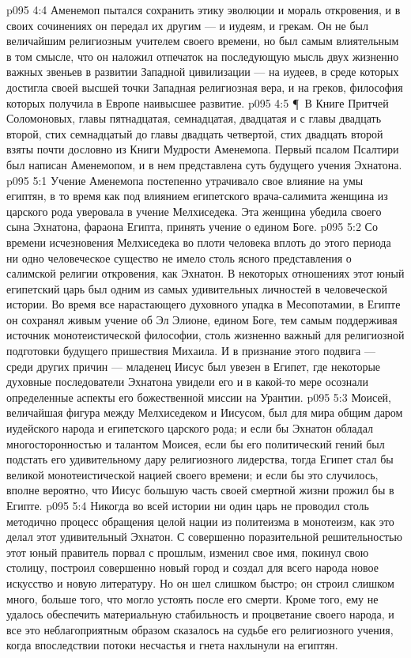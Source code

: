 \vs p095 4:4 Аменемоп пытался сохранить этику эволюции и мораль откровения, и в своих сочинениях он передал их другим --- и иудеям, и грекам. Он не был величайшим религиозным учителем своего времени, но был самым влиятельным в том смысле, что он наложил отпечаток на последующую мысль двух жизненно важных звеньев в развитии Западной цивилизации --- на иудеев, в среде которых достигла своей высшей точки Западная религиозная вера, и на греков, философия которых получила в Европе наивысшее развитие.
\vs p095 4:5 \P\ В Книге Притчей Соломоновых, главы пятнадцатая, семнадцатая, двадцатая и с главы двадцать второй, стих семнадцатый до главы двадцать четвертой, стих двадцать второй взяты почти дословно из Книги Мудрости Аменемопа. Первый псалом Псалтири был написан Аменемопом, и в нем представлена суть будущего учения Эхнатона.
\vs p095 5:1 Учение Аменемопа постепенно утрачивало свое влияние на умы египтян, в то время как под влиянием египетского врача\hyp{}салимита женщина из царского рода уверовала в учение Мелхиседека. Эта женщина убедила своего сына Эхнатона, фараона Египта, принять учение о едином Боге.
\vs p095 5:2 Со времени исчезновения Мелхиседека во плоти человека вплоть до этого периода ни одно человеческое существо не имело столь ясного представления о салимской религии откровения, как Эхнатон. В некоторых отношениях этот юный египетский царь был одним из самых удивительных личностей в человеческой истории. Во время все нарастающего духовного упадка в Месопотамии, в Египте он сохранял живым учение об Эл Элионе, едином Боге, тем самым поддерживая источник монотеистической философии, столь жизненно важный для религиозной подготовки будущего пришествия Михаила. И в признание этого подвига --- среди других причин --- младенец Иисус был увезен в Египет, где некоторые духовные последователи Эхнатона увидели его и в какой\hyp{}то мере осознали определенные аспекты его божественной миссии на Урантии.
\vs p095 5:3 Моисей, величайшая фигура между Мелхиседеком и Иисусом, был для мира общим даром иудейского народа и египетского царского рода; и если бы Эхнатон обладал многосторонностью и талантом Моисея, если бы его политический гений был подстать его удивительному дару религиозного лидерства, тогда Египет стал бы великой монотеистической нацией своего времени; и если бы это случилось, вполне вероятно, что Иисус большую часть своей смертной жизни прожил бы в Египте.
\vs p095 5:4 Никогда во всей истории ни один царь не проводил столь методично процесс обращения целой нации из политеизма в монотеизм, как это делал этот удивительный Эхнатон. С совершенно поразительной решительностью этот юный правитель порвал с прошлым, изменил свое имя, покинул свою столицу, построил совершенно новый город и создал для всего народа новое искусство и новую литературу. Но он шел слишком быстро; он строил слишком много, больше того, что могло устоять после его смерти. Кроме того, ему не удалось обеспечить материальную стабильность и процветание своего народа, и все это неблагоприятным образом сказалось на судьбе его религиозного учения, когда впоследствии потоки несчастья и гнета нахлынули на египтян.
